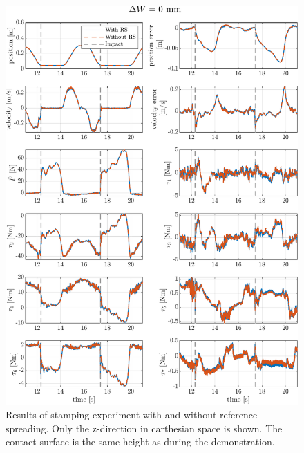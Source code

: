 \documentclass[11pt]{report}
\numberwithin{equation}{section}        %
\numberwithin{figure}{section}          %
\numberwithin{table}{section}           %
\begin{document}
 \begin{figure}[]
  \centering
  \begin{adjustwidth}{0pt}{5pt}
  \includegraphics[right]{Graphics/result0mm.pdf}
  \end{adjustwidth}
  \caption{Results of stamping experiment with and without reference spreading. Only the z-direction in carthesian space is shown. The contact surface is the same height as during the demonstration.}
  \label{fig:results_0mm}
  \end{figure}
\end{document}
